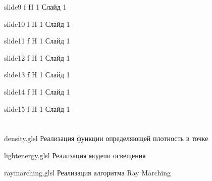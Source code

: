 \begin{appendices}
	{slide9} %
	{f} %
	{H} %
	{1\textwidth} %
	{Слайд 1} %
	
	{slide10} %
	{f} %
	{H} %
	{1\textwidth} %
	{Слайд 1} %
	
	{slide11} %
	{f} %
	{H} %
	{1\textwidth} %
	{Слайд 1} %
	
	{slide12} %
	{f} %
	{H} %
	{1\textwidth} %
	{Слайд 1} %
	
	{slide13} %
	{f} %
	{H} %
	{1\textwidth} %
	{Слайд 1} %
	
	{slide14} %
	{f} %
	{H} %
	{1\textwidth} %
	{Слайд 1} %
	
	{slide15} %
	{f} %
	{H} %
	{1\textwidth} %
	{Слайд 1} %
	
	\chapter{}
	\label{app:listings}
	
	{density.glsl} %
	{} %
	{Реализация функции определяющей плотность в точке} %
	
	
	{lightenergy.glsl} %
	{} %
	{Реализация модели освещения} %
	
	
	{raymarching.glsl} %
	{} %
	{Реализация алгоритма Ray Marching} %
	
\end{appendices}